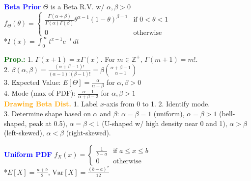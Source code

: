 \documentclass[5pt]{extarticle} %
\begin{document}
\begin{paracol}{3}
{    %


    \textcolor{blue}{\textbf{Beta Prior}} $\Theta$ is a Beta R.V. w/ $\alpha,\beta>0$\\
    $f_\Theta (\theta) = \begin{cases}
        \frac{\Gamma(\alpha + \beta)}{\Gamma(\alpha) \Gamma(\beta)} \theta^{\alpha - 1} (1 - \theta)^{\beta - 1} & \text{if } 0 < \theta < 1 \\
        0 & \text{otherwise}
    \end{cases}$ \\
    *$\Gamma(x) = \int_{0}^{\infty} t^{x-1} e^{-t} \, dt$

    \textcolor{darkgreen}{\textbf{Prop.:}} 1. $\Gamma(x+1) = x \Gamma(x)$. For $m \in \mathbb{Z}^+$, $\Gamma(m+1) = m!$. \\
    2. $\beta(\alpha,\beta) = \frac{(\alpha + \beta -1)!}{(\alpha - 1)! (\beta - 1)!} = \beta \binom{\alpha + \beta - 1}{\alpha - 1}$ \\
    3. Expected Value: $E[\Theta] = \frac{\alpha}{\alpha + \beta}$ for $\alpha, \beta > 0$ \\
    4. Mode (max of PDF): $\frac{\alpha - 1}{\alpha + \beta - 2}$ for $\alpha, \beta > 1$ \\

    \textcolor{orange}{\textbf{Drawing Beta Dist.}} 1. Label $x$-axis from 0 to 1. 2. Identify mode. \\ 
    3. Determine shape based on $\alpha$ and $\beta$: $\alpha = \beta = 1$ (uniform), $\alpha = \beta > 1$ (bell-shaped, peak at 0.5), $\alpha = \beta < 1$ (U-shaped w/ high density near 0 and 1), $\alpha > \beta$ (left-skewed), $\alpha < \beta$ (right-skewed).

    \textcolor{blue}{\textbf{Uniform PDF}} $f_X(x) = \begin{cases}
        \frac{1}{b - a} & \text{if } a \leq x \leq b \\
        0 & \text{otherwise}
    \end{cases}$ \\
    *$E[X] = \frac{a + b}{2}$, $\text{Var}[X] = \frac{(b - a)^2}{12}$

}
\end{paracol}
\end{document}
